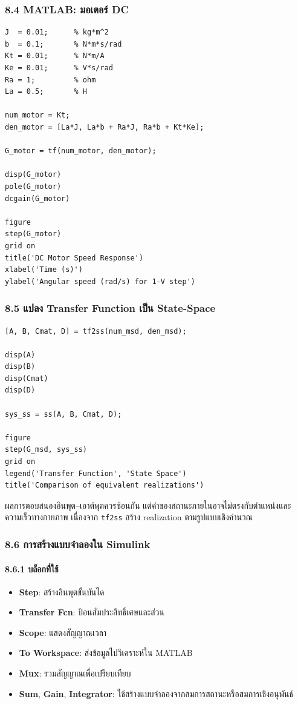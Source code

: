 \subsubsection{8.4 MATLAB: มอเตอร์ DC}

\begin{verbatim}
J  = 0.01;      % kg*m^2
b  = 0.1;       % N*m*s/rad
Kt = 0.01;      % N*m/A
Ke = 0.01;      % V*s/rad
Ra = 1;         % ohm
La = 0.5;       % H

num_motor = Kt;
den_motor = [La*J, La*b + Ra*J, Ra*b + Kt*Ke];

G_motor = tf(num_motor, den_motor);

disp(G_motor)
pole(G_motor)
dcgain(G_motor)

figure
step(G_motor)
grid on
title('DC Motor Speed Response')
xlabel('Time (s)')
ylabel('Angular speed (rad/s) for 1-V step')
\end{verbatim}

\subsubsection{8.5 แปลง Transfer Function เป็น State-Space}

\begin{verbatim}
[A, B, Cmat, D] = tf2ss(num_msd, den_msd);

disp(A)
disp(B)
disp(Cmat)
disp(D)

sys_ss = ss(A, B, Cmat, D);

figure
step(G_msd, sys_ss)
grid on
legend('Transfer Function', 'State Space')
title('Comparison of equivalent realizations')
\end{verbatim}

ผลการตอบสนองอินพุต–เอาต์พุตควรซ้อนกัน แต่ค่าของสถานะภายในอาจไม่ตรงกับตำแหน่งและความเร็วทางกายภาพ เนื่องจาก \texttt{tf2ss} สร้าง realization ตามรูปแบบเชิงคำนวณ

\subsubsection{8.6 การสร้างแบบจำลองใน Simulink}

\paragraph{8.6.1 บล็อกที่ใช้}

\begin{itemize}
    \item \textbf{Step}: สร้างอินพุตขั้นบันได
    \item \textbf{Transfer Fcn}: ป้อนสัมประสิทธิ์เศษและส่วน
    \item \textbf{Scope}: แสดงสัญญาณเวลา
    \item \textbf{To Workspace}: ส่งข้อมูลไปวิเคราะห์ใน MATLAB
    \item \textbf{Mux}: รวมสัญญาณเพื่อเปรียบเทียบ
    \item \textbf{Sum}, \textbf{Gain}, \textbf{Integrator}: ใช้สร้างแบบจำลองจากสมการสถานะหรือสมการเชิงอนุพันธ์
\end{itemize}

